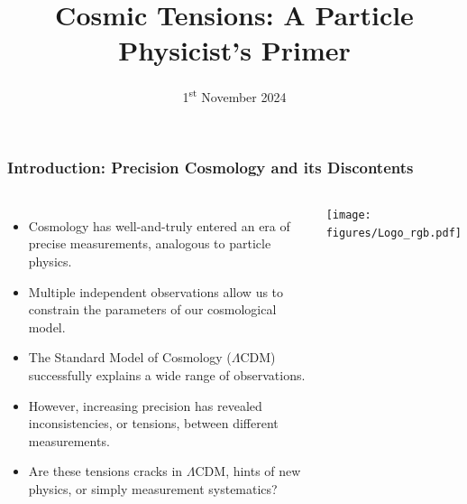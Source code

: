 \documentclass[aspectratio=169]{beamer}
\title{Cosmic Tensions: A Particle Physicist's Primer}
\date{1\textsuperscript{st} November 2024}
\begin{document}
\begin{frame}
    \titlepage
\end{frame}

\begin{frame}
    \frametitle{Introduction: Precision Cosmology and its Discontents}
    \begin{columns}
        \begin{itemize}
            \item Cosmology has well-and-truly entered an era of precise measurements, analogous to particle physics.
            \item Multiple independent observations allow us to constrain the parameters of our cosmological model.
            \item The Standard Model of Cosmology ($\Lambda$CDM) successfully explains a wide range of observations.
            \item However, increasing precision has revealed inconsistencies, or tensions, between different measurements.
            \item Are these tensions cracks in $\Lambda$CDM, hints of new physics, or simply measurement systematics?
        \end{itemize}
        \texttt{[image: figures/Logo\_rgb.pdf]}
    \end{columns}
\end{frame}
\end{document}
